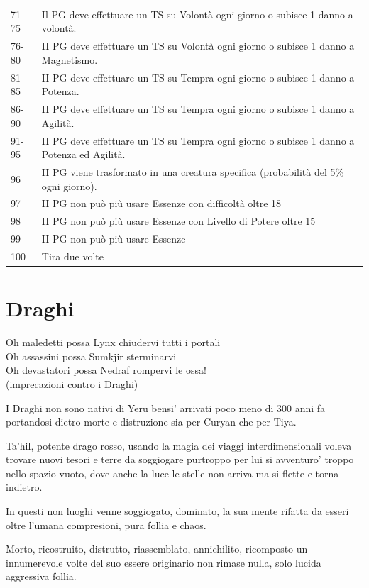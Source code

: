 \documentclass[a4paper,11pt,twoside,openany]{book}
\begin{document}
\begin{tabular}{ll}
	71-75       & Il PG deve effettuare un TS su Volontà ogni giorno o subisce 1 danno a volontà.\tabularnewline
	76-80       & II PG deve effettuare un TS su Volontà ogni giorno o subisce 1 danno a Magnetismo.\tabularnewline
	81-85       & II PG deve effettuare un TS su Tempra ogni giorno o subisce 1 danno a Potenza.\tabularnewline
	86-90       & II PG deve effettuare un TS su Tempra ogni giorno o subisce 1 danno a Agilità.\tabularnewline
	91-95       & II PG deve effettuare un TS su Tempra ogni giorno o subisce 1 danno a Potenza ed Agilità.\tabularnewline
	96          & II PG viene trasformato in una creatura specifica (probabilità del 5\% ogni giorno).\tabularnewline
	97          & II PG non può più usare Essenze con difficoltà oltre 18\tabularnewline
	98          & II PG non può più usare Essenze con Livello di Potere oltre 15\tabularnewline
	99          & II PG non può più usare Essenze\tabularnewline
	100         & Tira due volte\tabularnewline
\end{tabular}

\pagebreak

\section{Draghi}
\label{draghi}

\begin{tcolorbox}[enhanced,arc=5pt,boxrule=0.3pt]{
		Oh maledetti possa Lynx chiudervi tutti i portali\\
		Oh assassini possa Sumkjir sterminarvi\\
		Oh devastatori possa Nedraf rompervi le ossa!\\
		(imprecazioni contro i Draghi)}\end{tcolorbox}\medskip

I Draghi non sono nativi di Yeru bensi' arrivati poco meno di 300 anni fa portandosi dietro morte e distruzione sia per Curyan che per Tiya.

Ta'hil, potente drago rosso, usando la magia dei viaggi interdimensionali voleva trovare nuovi tesori e terre da soggiogare purtroppo per lui si avventuro' troppo nello spazio vuoto, dove anche la luce le stelle non arriva ma si flette e torna indietro.

In questi non luoghi venne soggiogato, dominato, la sua mente rifatta da esseri oltre l'umana compresioni, pura follia e chaos.

Morto, ricostruito, distrutto, riassemblato, annichilito, ricomposto un innumerevole volte del suo essere originario non rimase nulla, solo lucida aggressiva follia.
\end{document}
